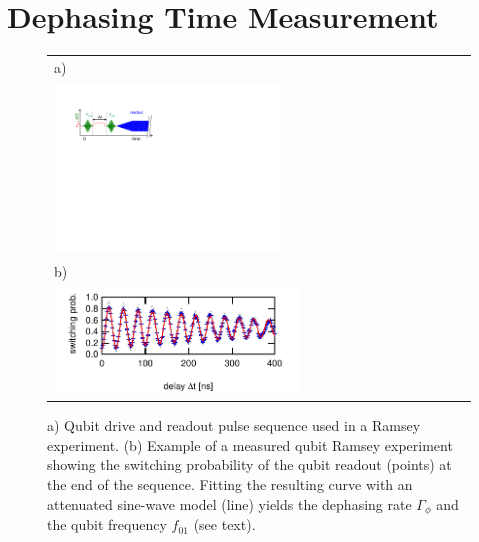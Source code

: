 \section{Dephasing Time Measurement}

\begin{figure}[ht!]
\begin{center}
\begin{tabular}{l}
a) \\ \includegraphics[width=0.55\textwidth]{"./material/figures/measurement/qubit_ramsey_oscillation"} \\
b) \\ \includegraphics[width=0.6\textwidth]{"./data/ct5/2011_04_21 - grover and tomo/example - qubit 2 ramsey"} \\
\end{tabular}
\end{center}
\caption[]{a) Qubit drive and readout pulse sequence used in a Ramsey experiment. (b) Example of a measured qubit Ramsey experiment showing the switching probability of the qubit readout (points) at the end of the sequence. Fitting the resulting curve with an attenuated sine-wave model (line) yields the dephasing rate $\Gamma_{\phi}$ and the qubit frequency $f_{01}$ (see text).}
\label{fig:qubit_ramsey_example}
\end{figure}

